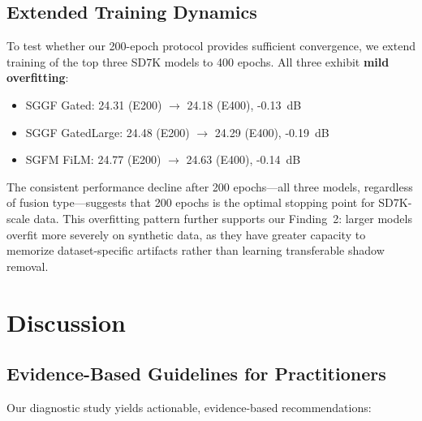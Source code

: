 \documentclass[11pt]{article}
\begin{document}
\subsection{Extended Training Dynamics}
\label{sec:extended}

To test whether our 200-epoch protocol provides sufficient convergence, we extend training of the top three SD7K models to 400 epochs.
All three exhibit \textbf{mild overfitting}:

\begin{itemize}
  \item SGGF Gated: 24.31 (E200) $\rightarrow$ 24.18 (E400), -0.13~dB
  \item SGGF GatedLarge: 24.48 (E200) $\rightarrow$ 24.29 (E400), -0.19~dB
  \item SGFM FiLM: 24.77 (E200) $\rightarrow$ 24.63 (E400), -0.14~dB
\end{itemize}

The consistent performance decline after 200 epochs---all three models, regardless of fusion type---suggests that 200 epochs is the optimal stopping point for SD7K-scale data.
This overfitting pattern further supports our Finding~2: larger models overfit more severely on synthetic data, as they have greater capacity to memorize dataset-specific artifacts rather than learning transferable shadow removal.

\section{Discussion}

\subsection{Evidence-Based Guidelines for Practitioners}

Our diagnostic study yields actionable, evidence-based recommendations:
\end{document}
